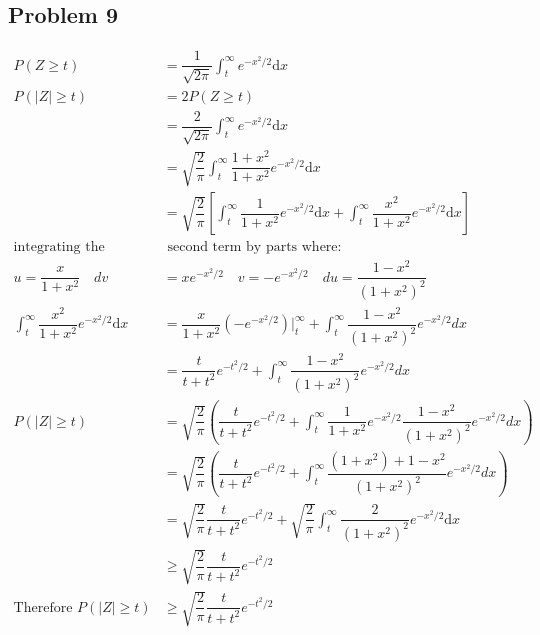 \documentclass{article}
\newcommand{\dx}{\mathrm{d}x}
\begin{document}
\begin{flushleft}
\section*{Problem 9}
\begin{align*}
P(Z\geq t)&=\dfrac{1}{\sqrt{2\pi}}\int_{t}^{\infty}e^{-x^2/2}\dx\\
P(|Z|\geq t)&=2P(Z\geq t)\\
&=\dfrac{2}{\sqrt{2\pi}}\int_{t}^{\infty}e^{-x^2/2}\dx\\
&=\sqrt{\dfrac{2}{\pi}}\int_{t}^{\infty}\dfrac{1+x^2}{1+x^2}e^{-x^2/2}\dx\\
&=\sqrt{\dfrac{2}{\pi}}\left[\int_{t}^{\infty}\dfrac{1}{1+x^2}e^{-x^2/2}\dx+\int_{t}^{\infty}\dfrac{x^2}{1+x^2}e^{-x^2/2}\dx\right]\\
\text{integrating the}&\text{ second term by parts where:}\\
 u=\dfrac{x}{1+x^2} \quad dv&=xe^{-x^2/2} \quad v=-e^{-x^2/2} \quad du=\dfrac{1-x^2}{(1+x^2)^2}\\
\int_{t}^{\infty}\dfrac{x^2}{1+x^2}e^{-x^2/2}\dx&=\dfrac{x}{1+x^2}(-e^{-x^2/2})\bigg|_{t}^{\infty}+\int_{t}^{\infty}\dfrac{1-x^2}{(1+x^2)^2}e^{-x^2/2}dx\\
&=\dfrac{t}{t+t^2}e^{-t^2/2}+\int_{t}^{\infty}\dfrac{1-x^2}{(1+x^2)^2}e^{-x^2/2}dx\\
P(|Z|\geq t)&=\sqrt{\dfrac{2}{\pi}}\left(\dfrac{t}{t+t^2}e^{-t^2/2}+\int_{t}^{\infty}\dfrac{1}{1+x^2}e^{-x^2/2}\dfrac{1-x^2}{(1+x^2)^2}e^{-x^2/2}dx\right)\\
&=\sqrt{\dfrac{2}{\pi}}\left(\dfrac{t}{t+t^2}e^{-t^2/2}+\int_{t}^{\infty}\dfrac{(1+x^2)+1-x^2}{(1+x^2)^2}e^{-x^2/2}dx\right)\\
&=\sqrt{\dfrac{2}{\pi}}\dfrac{t}{t+t^2}e^{-t^2/2}+\sqrt{\dfrac{2}{\pi}}\int_{t}^{\infty}\dfrac{2}{(1+x^2)^2}e^{-x^2/2}\dx\\
&\geq \sqrt{\dfrac{2}{\pi}}\dfrac{t}{t+t^2}e^{-t^2/2}\\
\text{Therefore } P(|Z|\geq t)&\geq \sqrt{\dfrac{2}{\pi}}\dfrac{t}{t+t^2}e^{-t^2/2}
\end{align*}
\end{flushleft}
\end{document}
